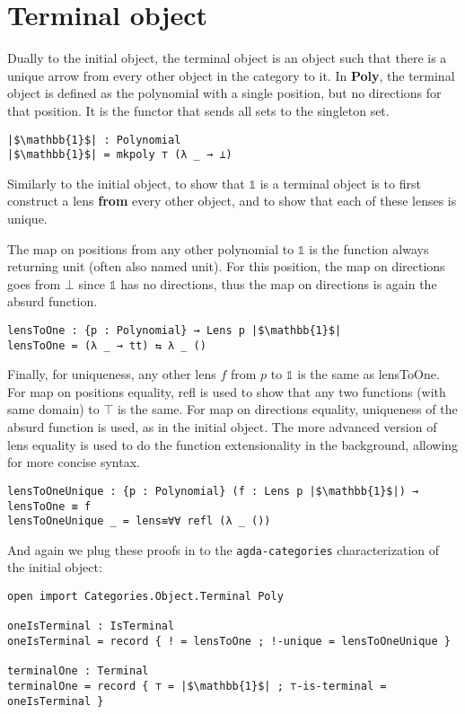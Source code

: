 \section{Terminal object}
Dually to the initial object, the terminal object is an object such that there is a unique arrow from every other object in the category to it. In \textbf{Poly}, the terminal object is defined as the polynomial with a single position, but no directions for that position. It is the functor that sends all sets to the singleton set.

\begin{verbatim}
|$\mathbb{1}$| : Polynomial
|$\mathbb{1}$| = mkpoly ⊤ (λ _ → ⊥)
\end{verbatim}

Similarly to the initial object, to show that $\mathbb{1}$ is a terminal object is to first construct a lens \textbf{from} every other object, and to show that each of these lenses is unique.

The map on positions from any other polynomial to $\mathbb{1}$ is the function always returning unit (often also named unit). For this position, the map on directions goes from $\bot$ since $\mathbb{1}$ has no directions, thus the map on directions is again the absurd function.

\begin{verbatim}
lensToOne : {p : Polynomial} → Lens p |$\mathbb{1}$|
lensToOne = (λ _ → tt) ⇆ λ _ ()
\end{verbatim}

Finally, for uniqueness, any other lens $f$ from $p$ to $\mathbb{1}$ is the same as lensToOne. For map on positions equality, refl is used to show that any two functions (with same domain) to $\top$ is the same. For map on directions equality, uniqueness of the absurd function is used, as in the initial object. The more advanced version of lens equality is used to do the function extensionality in the background, allowing for more concise syntax.

\begin{verbatim}
lensToOneUnique : {p : Polynomial} (f : Lens p |$\mathbb{1}$|) →  lensToOne ≡ f
lensToOneUnique _ = lens≡∀∀ refl (λ _ ())
\end{verbatim}

And again we plug these proofs in to the \texttt{agda-categories} characterization of the initial object:

\begin{verbatim}
open import Categories.Object.Terminal Poly

oneIsTerminal : IsTerminal
oneIsTerminal = record { ! = lensToOne ; !-unique = lensToOneUnique }

terminalOne : Terminal
terminalOne = record { ⊤ = |$\mathbb{1}$| ; ⊤-is-terminal = oneIsTerminal }
\end{verbatim}

